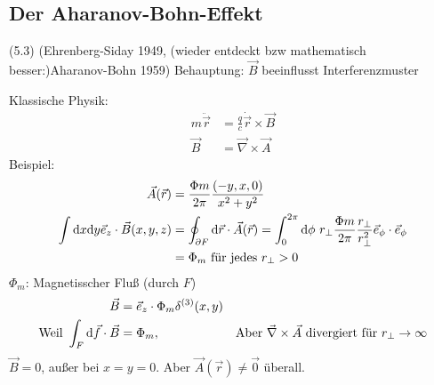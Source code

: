 \subsection{Der Aharanov-Bohn-Effekt} (5.3)
(Ehrenberg-Siday 1949, (wieder entdeckt bzw mathematisch besser:)Aharanov-Bohn 1959)
Behauptung: $\vec{B}$ beeinflusst Interferenzmuster

Klassische Physik:
	\begin{align*}
		m \ddot{\vec{r}} &= \frac{q}{c} \dot{\vec{r}} \times \vec{B} \\
		\vec{B} &= \vec{\nabla} \times \vec{A}
	\end{align*}
Beispiel:
	\begin{align*}
		\vec{A}(\vec{r}) &= \frac{\Phi m}{2\pi} \frac{(-y,x,0)}{x^2 + y^2} \\
		\int \mathrm{d} x \mathrm{d} y \vec{e}_z \cdot \vec{B}(x,y,z) &=
		\oint_{\partial F} \mathrm{d} \vec{r} \cdot \vec{A}(\vec{r})=
		\int_{0}^{2 \pi} \mathrm{d} \phi ~r_{\perp} \frac{\Phi m}{2 \pi} \frac{r_{\perp}}{r_{\perp}^2} \vec{e}_\phi \cdot \vec{e}_\phi \\
		&=\Phi_m ~\text{für jedes } r_{\perp} > 0
	\end{align*}
$\Phi_m$: Magnetisscher Fluß (durch $F$)
	\begin{align*}
		\vec{B} &= \vec{e}_z \cdot \Phi_m \delta^{(3)}(x,y) \\
		\text{Weil } \int_F \mathrm{d} \vec{f} \cdot \vec{B} &= \Phi_m,&
		\text{Aber } \vec{\nabla} \times \vec{A} \text{ divergiert für } r_{\perp} \rightarrow \infty
	\end{align*}
$\vec{B} = 0$, außer bei $x=y=0$. Aber $\vec{A}(\vec{r}) \neq \vec{0}$ überall.

